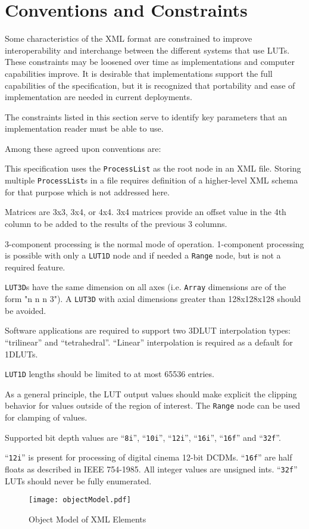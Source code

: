\regularsectionformat
\chapter{Conventions and Constraints}
\label{sec:conventions}

Some characteristics of the XML format are constrained to improve interoperability and interchange between the different systems that use LUTs. These constraints may be loosened over time as implementations and computer capabilities improve. It is desirable that implementations support the full capabilities of the specification, but it is recognized that portability and ease of implementation are needed in current deployments.

The constraints listed in this section serve to identify key parameters that an implementation reader must be able to use.

Among these agreed upon conventions are:

This specification uses the \texttt{ProcessList} as the root node in an XML file.  Storing multiple \texttt{ProcessList}s in a file requires definition of a higher-level XML schema for that purpose which is not addressed here.

Matrices are 3x3, 3x4, or 4x4. 3x4 matrices provide an offset value in the 4th column to be added to the results of the previous 3 columns.  

3-component processing is the normal mode of operation.  1-component processing is possible with only a \texttt{LUT1D} node and if needed a \texttt{Range} node, but is not a required feature.

\texttt{LUT3D}s have the same dimension on all axes (i.e. \texttt{Array} dimensions are of the form "n n n 3").  A \texttt{LUT3D} with axial dimensions greater than 128x128x128 should be avoided.

Software applications are required to support two 3DLUT interpolation types: ``trilinear'' and ``tetrahedral''.  ``Linear'' interpolation is required as a default for 1DLUTs.

\texttt{LUT1D} lengths should be limited to at most 65536 entries.

As a general principle, the LUT output values should make explicit the clipping behavior for values outside of the region of interest. The \texttt{Range} node can be used for clamping of values.

Supported bit depth values are ``\texttt{8i}'', ``\texttt{10i}'', ``\texttt{12i}'', ``\texttt{16i}'', ``\texttt{16f}'' and ``\texttt{32f}''.

``\texttt{12i}'' is present for processing of digital cinema 12-bit DCDMs. ``\texttt{16f}'' are half floats as described in IEEE 754-1985. All integer values are unsigned ints. ``\texttt{32f}'' LUTs should never be fully enumerated.
 
\begin{figure}[htbp]
\begin{center}
    \texttt{[image: objectModel.pdf]}
\caption{Object Model of XML Elements}
\label{fig:lmt}
\end{center}
\end{figure}